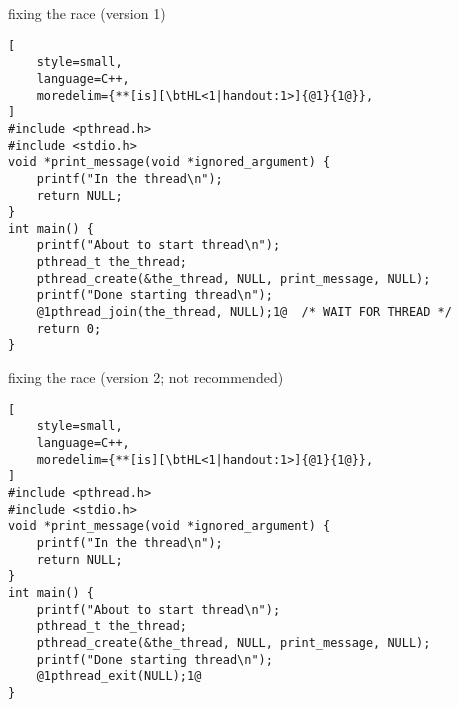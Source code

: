 


\begin{frame}[fragile,label=fixRace1]{fixing the race (version 1)}
\begin{lstlisting}[
    style=small,
    language=C++,
    moredelim={**[is][\btHL<1|handout:1>]{@1}{1@}},
]
#include <pthread.h>
#include <stdio.h>
void *print_message(void *ignored_argument) {
    printf("In the thread\n");
    return NULL;
}
int main() {
    printf("About to start thread\n");
    pthread_t the_thread;
    pthread_create(&the_thread, NULL, print_message, NULL);
    printf("Done starting thread\n");
    @1pthread_join(the_thread, NULL);1@  /* WAIT FOR THREAD */
    return 0;
}
\end{lstlisting}
\end{frame}

\begin{frame}[fragile,label=fixRace2]{fixing the race (version 2; not recommended)}
\begin{lstlisting}[
    style=small,
    language=C++,
    moredelim={**[is][\btHL<1|handout:1>]{@1}{1@}},
]
#include <pthread.h>
#include <stdio.h>
void *print_message(void *ignored_argument) {
    printf("In the thread\n");
    return NULL;
}
int main() {
    printf("About to start thread\n");
    pthread_t the_thread;
    pthread_create(&the_thread, NULL, print_message, NULL);
    printf("Done starting thread\n");
    @1pthread_exit(NULL);1@
}
\end{lstlisting}
\end{frame}

